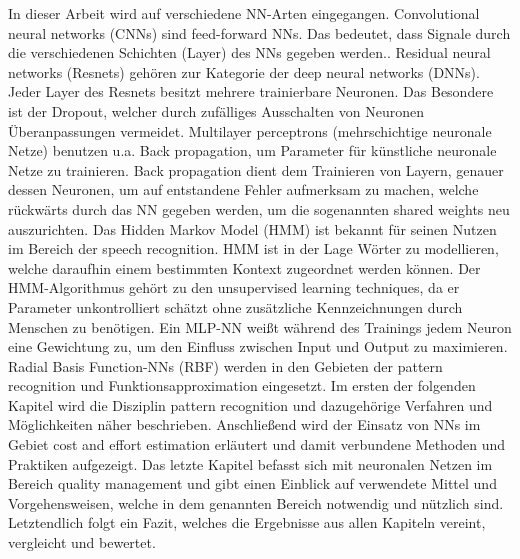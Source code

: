 In dieser Arbeit wird auf verschiedene NN-Arten eingegangen. Convolutional neural networks (CNNs) sind feed-forward NNs. Das bedeutet, dass Signale durch die verschiedenen Schichten (Layer) des NNs gegeben werden..\cite{usingcnn} Residual neural networks (Resnets) gehören zur Kategorie der deep neural networks (DNNs). Jeder Layer des Resnets besitzt mehrere trainierbare Neuronen. Das Besondere ist der Dropout, welcher durch zufälliges Ausschalten von Neuronen Überanpassungen vermeidet.\cite{residualnn} Multilayer perceptrons (mehrschichtige neuronale Netze) benutzen u.a. Back propagation, um Parameter für künstliche neuronale Netze zu trainieren. Back propagation dient dem Trainieren von Layern, genauer dessen Neuronen, um auf entstandene Fehler aufmerksam zu machen, welche rückwärts durch das NN gegeben werden, um die sogenannten shared weights neu auszurichten.\cite{usingcnn} Das Hidden Markov Model (HMM) ist bekannt für seinen Nutzen im Bereich der speech recognition. HMM ist in der Lage Wörter zu modellieren, welche daraufhin einem bestimmten Kontext zugeordnet werden können. Der HMM-Algorithmus gehört zu den unsupervised learning techniques, da er Parameter unkontrolliert schätzt ohne zusätzliche Kennzeichnungen durch Menschen zu benötigen. \cite{hmm} Ein MLP-NN weißt während des Trainings jedem Neuron eine Gewichtung zu, um den Einfluss zwischen Input und Output zu maximieren.\cite{Khalifelu2012} Radial Basis Function-NNs (RBF) werden in den Gebieten der pattern recognition und Funktionsapproximation eingesetzt. Im ersten der folgenden Kapitel wird die Disziplin pattern recognition und dazugehörige Verfahren und Möglichkeiten näher beschrieben. Anschließend wird der Einsatz von NNs im Gebiet cost and effort estimation erläutert und damit verbundene Methoden und Praktiken aufgezeigt. Das letzte Kapitel befasst sich mit neuronalen Netzen im Bereich quality management und gibt einen Einblick auf verwendete Mittel und Vorgehensweisen, welche in dem genannten Bereich notwendig und nützlich sind. Letztendlich folgt ein Fazit, welches die Ergebnisse aus allen Kapiteln vereint, vergleicht und bewertet.